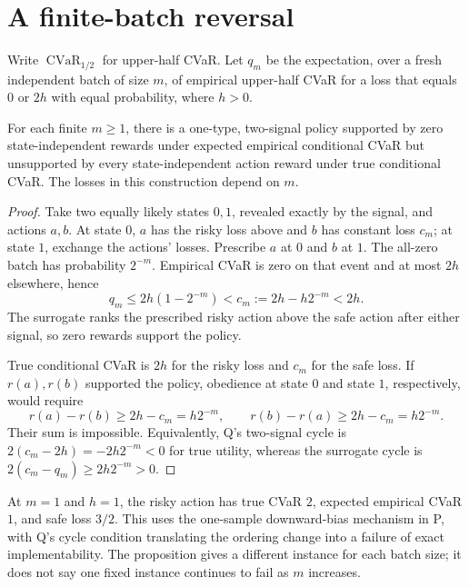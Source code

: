 \documentclass{article}
\begin{document}
\section{A finite-batch reversal}

Write \(\operatorname{CVaR}_{1/2}\) for upper-half CVaR. Let \(q_m\) be the expectation, over a fresh independent batch of size \(m\), of empirical upper-half CVaR for a loss that equals \(0\) or \(2h\) with equal probability, where \(h>0\). %

\begin{proposition}\label{prop:reversal}
For each finite \(m\geq 1\), there is a one-type, two-signal policy supported by zero state-independent rewards under expected empirical conditional CVaR but unsupported by every state-independent action reward under true conditional CVaR. The losses in this construction depend on \(m\). %
\end{proposition}

\begin{proof}
Take two equally likely states \(0,1\), revealed exactly by the signal, and actions \(a,b\). At state \(0\), \(a\) has the risky loss above and \(b\) has constant loss \(c_m\); at state \(1\), exchange the actions' losses. Prescribe \(a\) at \(0\) and \(b\) at \(1\). The all-zero batch has probability \(2^{-m}\). Empirical CVaR is zero on that event and at most \(2h\) elsewhere, hence
\[
q_m\leq 2h(1-2^{-m})<c_m:=2h-h2^{-m}<2h.
\]
The surrogate ranks the prescribed risky action above the safe action after either signal, so zero rewards support the policy. %

True conditional CVaR is \(2h\) for the risky loss and \(c_m\) for the safe loss. If \(r(a),r(b)\) supported the policy, obedience at state \(0\) and state \(1\), respectively, would require
\[
r(a)-r(b)\geq 2h-c_m=h2^{-m},\qquad
r(b)-r(a)\geq 2h-c_m=h2^{-m}.
\]
Their sum is impossible. Equivalently, Q's two-signal cycle is \(2(c_m-2h)=-2h2^{-m}<0\) for true utility, whereas the surrogate cycle is \(2(c_m-q_m)\geq2h2^{-m}>0\). %
\end{proof}

At \(m=1\) and \(h=1\), the risky action has true CVaR \(2\), expected empirical CVaR \(1\), and safe loss \(3/2\). This uses the one-sample downward-bias mechanism in P, with Q's cycle condition translating the ordering change into a failure of exact implementability. The proposition gives a different instance for each batch size; it does not say one fixed instance continues to fail as \(m\) increases. %
\end{document}
